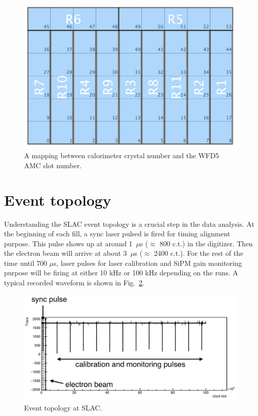 \begin{figure}[htbp]
\centering
\includegraphics[width=.7\textwidth]{pics/CaloWFD5Map}
\caption{\label{fig:calowfd5map}A mapping between calorimeter crystal number and the WFD5 AMC slot number.}
\end{figure}

\section{Event topology}

Understanding the SLAC event topology is a crucial step in the data analysis.
At the beginning of each fill, a sync laser pulsed is fired for timing alignment purpose. This pulse shows up at around 1~$\mu$s ($\approx$ 800 c.t.) in the digitizer.
Then the electron beam will arrive at about 3~$\mu$s ($\approx$ 2400 c.t.).
For the rest of the time until 700 $\mu$s, laser pulses for laser calibration and SiPM gain monitoring purpose will be firing at either 10 kHz or 100 kHz depending on the runs.
A typical recorded waveform is shown in Fig.~\ref{fig:eventtopology}.

\begin{figure}[htbp]
\centering
\includegraphics[width=.8\textwidth]{pics/eventtopology}
\caption{\label{fig:eventtopology} Event topology at SLAC.}
\end{figure}

